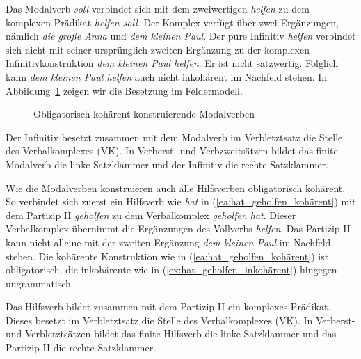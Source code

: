 Das Modalverb \textit{soll} verbindet sich mit dem zweiwertigen \textit{helfen} zu dem komplexen Prädikat \textit{helfen soll}. Der Komplex verfügt über zwei Ergänzungen, nämlich \textit{die große Anna} und \textit{dem kleinen Paul}. Der pure Infinitiv \textit{helfen} verbindet sich  nicht mit seiner ursprünglich zweiten Ergänzung zu der komplexen Infinitivkonstruktion \textit{dem kleinen Paul helfen}. Er ist nicht satzwertig. Folglich kann \textit{dem kleinen Paul helfen} auch nicht inkohärent im Nachfeld stehen. In Abbildung~\ref{fig:Kohärente_MV} zeigen wir die Besetzung im Feldermodell.

\begin{figure}[!htbp]
  \centering
  \caption{Obligatorisch kohärent konstruierende Modalverben}
  \label{fig:Kohärente_MV}
\end{figure} 

Der Infinitiv besetzt zusammen mit dem Modalverb im Verbletztsatz die Stelle des Verbalkomplexes (VK). In Verberst- und Verbzweitsätzen bildet das finite Modalverb die linke Satzklammer und der Infinitiv die rechte Satzklammer.

Wie die Modalverben konstruieren auch alle Hilfsverben obligatorisch kohärent. So verbindet sich zuerst ein Hilfsverb wie \textit{hat} in (\ref{ea:hat_geholfen_kohärent}) mit dem Partizip II \textit{geholfen} zu dem Verbalkomplex \textit{geholfen hat}. Dieser Verbalkomplex übernimmt die Ergänzungen des Vollverbs \textit{helfen}. Das Partizip II kann nicht alleine mit der zweiten Ergänzung \textit{dem kleinen Paul} im Nachfeld stehen. Die kohärente Konstruktion wie in (\ref{ea:hat_geholfen_kohärent}) ist obligatorisch, die inkohärente wie in (\ref{ex:hat_geholfen_inkohärent}) hingegen ungrammatisch. 

\ea 
{}\label{ea:hat_geholfen_kohärent}
\label{ex:hat_geholfen_inkohärent}
\z 
\z
 
Das Hilfsverb bildet zusammen mit dem Partizip II ein komplexes Prädikat. Dieses besetzt im Verbletztsatz die Stelle des Verbalkomplexes (VK). In Verberst- und Verbletztsätzen bildet das finite Hilfsverb die linke Satzklammer und das Partizip II die rechte Satzklammer.

